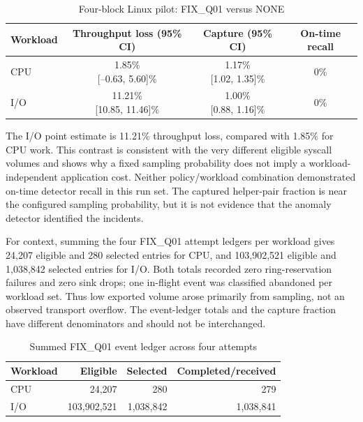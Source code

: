 \documentclass[conference]{IEEEtran}
\begin{document}
\begin{table}[t]
\caption{Four-block Linux pilot: FIX\_Q01 versus NONE}
\label{tab:pilot}
\centering
\scriptsize
\begin{tabular}{@{}lccc@{}}
\toprule
Workload & Throughput loss (95\% CI) & Capture (95\% CI) & On-time recall\\
\midrule
CPU & \shortstack{1.85\%\\{}[--0.63, 5.60]\%} & \shortstack{1.17\%\\{}[1.02, 1.35]\%} & 0\%\\
I/O & \shortstack{11.21\%\\{}[10.85, 11.46]\%} & \shortstack{1.00\%\\{}[0.88, 1.16]\%} & 0\%\\
\bottomrule
\end{tabular}
\end{table}

The I/O point estimate is 11.21\% throughput loss, compared with 1.85\% for CPU work. This contrast is consistent with the very different eligible syscall volumes and shows why a fixed sampling probability does not imply a workload-independent application cost. Neither policy/workload combination demonstrated on-time detector recall in this run set. The captured helper-pair fraction is near the configured sampling probability, but it is not evidence that the anomaly detector identified the incidents.

For context, summing the four FIX\_Q01 attempt ledgers per workload gives 24,207 eligible and 280 selected entries for CPU, and 103,902,521 eligible and 1,038,842 selected entries for I/O. Both totals recorded zero ring-reservation failures and zero sink drops; one in-flight event was classified abandoned per workload set. Thus low exported volume arose primarily from sampling, not an observed transport overflow. The event-ledger totals and the capture fraction have different denominators and should not be interchanged.

\begin{table}[t]
\caption{Summed FIX\_Q01 event ledger across four attempts}
\label{tab:events}
\centering
\scriptsize
\begin{tabular}{@{}lrrr@{}}
\toprule
Workload & Eligible & Selected & Completed/received\\
\midrule
CPU & 24,207 & 280 & 279\\
I/O & 103,902,521 & 1,038,842 & 1,038,841\\
\bottomrule
\end{tabular}
\end{table}
\end{document}
